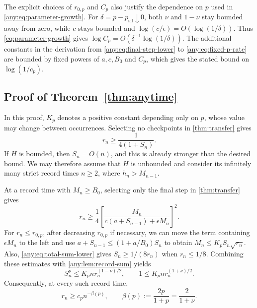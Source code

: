 \documentclass[11pt,letterpaper]{article}
\theoremstyle{definition}
\newcommand{\psil}{p_{\mathrm{sil}}}
\begin{document}
The explicit choices of $r_{0,p}$ and $C_p$ also justify the dependence on $p$ used in \eqref{any:eq:parameter-growth}.
For $\delta=p-\psil\downarrow0$, both $\nu$ and $1-\nu$ stay bounded away from zero, while $c$ stays bounded and $\log(c/\epsilon)=O(\log(1/\delta))$.
Thus \eqref{eq:parameter-growth} gives $\log C_p=O(\delta^{-1}\log(1/\delta))$.
The additional constants in the derivation from \eqref{any:eq:final-step-lower} to \eqref{any:eq:fixed-p-rate} are bounded by fixed powers of $a,c,B_0$ and $C_p$, which gives the stated bound on $\log(1/c_p)$.

\subsection{Proof of Theorem~\ref{thm:anytime}}
\label{any:app-main-proof}
In this proof, $K_p$ denotes a positive constant depending only on $p$, whose value may change between occurrences.
Selecting no checkpoints in \cref{thm:transfer} gives
\begin{equation}
    r_n\ge\frac{1}{4(1+S_n)}.
    \label{any:eq:total-sum-lower}
\end{equation}
If $H$ is bounded, then $S_n=O(n)$, and this is already stronger than the desired bound.
We may therefore assume that $H$ is unbounded and consider its infinitely many strict record times $n\ge2$, where $h_n>M_{n-1}$.

At a record time with $M_n\ge B_0$, selecting only the final step in \cref{thm:transfer} gives
\begin{equation}
    r_n\ge\frac14 \left[\frac{M_n}{c(a+S_{n-1})+\epsilon M_n}\right]^2.
    \label{any:eq:final-step-lower}
\end{equation}
For $r_n\le r_{0,p}$, after decreasing $r_{0,p}$ if necessary, we can move the term containing $\epsilon M_n$ to the left and use $a+S_{n-1}\le(1+a/B_0)S_n$ to obtain $M_n\le K_p S_n\sqrt{r_n}$.
Also, \eqref{any:eq:total-sum-lower} gives $S_n\ge1/(8r_n)$ when $r_n\le1/8$.
Combining these estimates with \cref{any:lem:record-sum} yields
\[
    S_n^\nu\le K_p n r_n^{(1-\nu)/2}, \qquad 1\le K_p n r_n^{(1+\nu)/2}.
\]
Consequently, at every such record time,
\begin{equation}
    r_n\ge c_p n^{-\beta(p)}, \qquad \beta(p):=\frac{2p}{1+p}=\frac{2}{1+\nu}.
    \label{any:eq:fixed-p-rate}
\end{equation}
\end{document}
